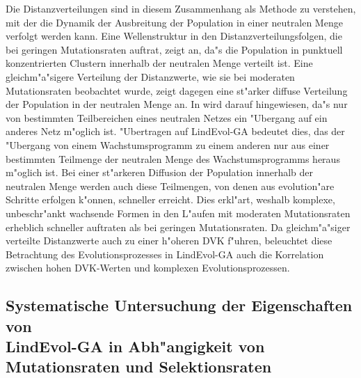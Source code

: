 Die Distanzverteilungen sind in diesem Zusammenhang als Methode zu verstehen, mit der die Dynamik der
Ausbreitung der Population in einer neutralen Menge verfolgt werden kann. Eine Wellenstruktur in den
Distanzverteilungsfolgen, die bei geringen Mutationsraten auftrat,
zeigt an, da"s die Population in punktuell konzentrierten Clustern innerhalb
der neutralen Menge verteilt ist. Eine gleichm"a"sigere Verteilung der Distanzwerte, wie sie bei moderaten
Mutationsraten beobachtet wurde, zeigt dagegen eine
st"arker diffuse Verteilung der Population in der neutralen Menge an.
In \cite{Forst95} wird darauf hingewiesen, da"s nur von bestimmten Teilbereichen eines neutralen Netzes
ein "Ubergang auf ein anderes Netz m"oglich ist. "Ubertragen auf LindEvol-GA bedeutet dies, das
der "Ubergang von einem Wachstumsprogramm zu einem anderen nur aus einer bestimmten Teilmenge
der neutralen Menge des Wachstumsprogramms heraus m"oglich ist. Bei einer st"arkeren Diffusion
der Population innerhalb der neutralen Menge werden auch diese Teilmengen, von denen aus evolution"are
Schritte erfolgen k"onnen, schneller erreicht. Dies erkl"art, weshalb komplexe, unbeschr"ankt wachsende
Formen in den L"aufen mit moderaten Mutationsraten erheblich schneller auftraten als bei geringen
Mutationsraten.  Da gleichm"a"siger verteilte Distanzwerte auch zu einer h"oheren DVK f"uhren, 
beleuchtet diese Betrachtung des Evolutionsprozesses in LindEvol-GA auch die Korrelation zwischen
hohen DVK-Werten und komplexen Evolutionsprozessen.




\subsection{Systematische Untersuchung der Eigenschaften von \\
LindEvol-GA in Abh"angigkeit von Mutationsraten und Selektionsraten}
\label{lndga-parameterscan}

